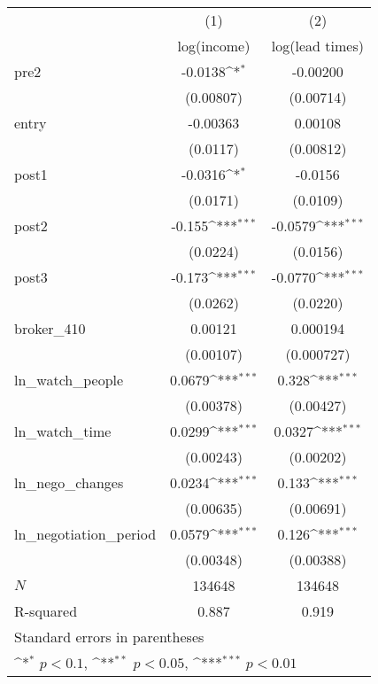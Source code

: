 {
\def\sym#1{\ifmmode^{#1}\else\(^{#1}\)\fi}
\begin{tabular}{l*{2}{c}}
\toprule
            &\multicolumn{1}{c}{(1)}&\multicolumn{1}{c}{(2)}\\
            &\multicolumn{1}{c}{log(income)}&\multicolumn{1}{c}{log(lead times)}\\
\midrule
pre2        &     -0.0138\sym{*}  &    -0.00200         \\
            &   (0.00807)         &   (0.00714)         \\
\addlinespace
entry       &    -0.00363         &     0.00108         \\
            &    (0.0117)         &   (0.00812)         \\
\addlinespace
post1       &     -0.0316\sym{*}  &     -0.0156         \\
            &    (0.0171)         &    (0.0109)         \\
\addlinespace
post2       &      -0.155\sym{***}&     -0.0579\sym{***}\\
            &    (0.0224)         &    (0.0156)         \\
\addlinespace
post3       &      -0.173\sym{***}&     -0.0770\sym{***}\\
            &    (0.0262)         &    (0.0220)         \\
\addlinespace
broker\_410  &     0.00121         &    0.000194         \\
            &   (0.00107)         &  (0.000727)         \\
\addlinespace
ln\_watch\_people&      0.0679\sym{***}&       0.328\sym{***}\\
            &   (0.00378)         &   (0.00427)         \\
\addlinespace
ln\_watch\_time&      0.0299\sym{***}&      0.0327\sym{***}\\
            &   (0.00243)         &   (0.00202)         \\
\addlinespace
ln\_nego\_changes&      0.0234\sym{***}&       0.133\sym{***}\\
            &   (0.00635)         &   (0.00691)         \\
\addlinespace
ln\_negotiation\_period&      0.0579\sym{***}&       0.126\sym{***}\\
            &   (0.00348)         &   (0.00388)         \\
\midrule
\(N\)       &      134648         &      134648         \\
R-squared   &       0.887         &       0.919         \\
\bottomrule
\multicolumn{3}{l}{\footnotesize Standard errors in parentheses}\\
\multicolumn{3}{l}{\footnotesize \sym{*} \(p<0.1\), \sym{**} \(p<0.05\), \sym{***} \(p<0.01\)}\\
\end{tabular}
}
